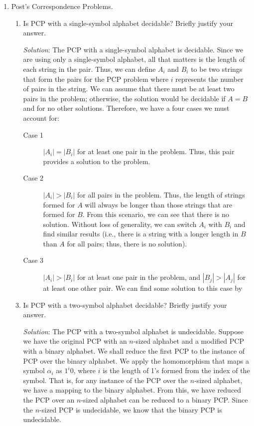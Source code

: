 \documentclass[]{article}
\begin{document}
\begin{enumerate}
\item Post's Correspondence Problems.
\begin{enumerate}
\item Is PCP with a single-symbol alphabet decidable? Briefly justify your
answer.
\item[\emph{Solution}:] The PCP with a single-symbol alphabet is decidable.
Since we are using only a single-symbol alphabet, all that matters is the length
of each string in the pair. Thus, we can define $A_i$ and $B_i$ to be two
strings that form the pairs for the PCP problem where $i$ represents the number
of pairs in the string. We can assume that there must be at least two pairs in
the problem; otherwise, the solution would be decidable if $A = B$ and for no
other solutions. Therefore, we have a four cases we must account for:
\begin{description}
\item[Case 1] $|A_i| = |B_i|$ for at least one pair in the problem. Thus, this
pair provides a solution to the problem.
\item[Case 2] $|A_i| > |B_i|$ for all pairs in the problem. Thus, the length of
strings formed for $A$ will always be longer than those strings that are formed
for $B$. From this scenario, we can see that there is no solution. Without loss
of generality, we can switch $A_i$ with $B_i$ and find similar results (i.e.,
there is a string with a longer length in $B$ than $A$ for all pairs; thus,
there is no solution).
\item[Case 3] $|A_i| > |B_i|$ for at least one pair in the problem, and $|B_j| >
|A_j|$ for at least one other pair. We can find some solution to this case by
\end{description}

\item Is PCP with a two-symbol alphabet decidable? Briefly justify your answer.
\item[\emph{Solution}:] The PCP with a two-symbol alphabet is undecidable.
Suppose we have the original PCP with an $n$-sized alphabet and a modified PCP
with a binary alphabet. We shall reduce the first PCP to the instance of PCP
over the binary alphabet. We apply the homomorphism that maps a symbol
$\alpha_i$ as $1^i0$, where $i$ is the length of 1's formed from the index of
the symbol. That is, for any instance of the PCP over the $n$-sized alphabet, we
have a mapping to the binary alphabet. From this, we have reduced the PCP over
an $n$-sized alphabet can be reduced to a binary PCP. Since the $n$-sized PCP is
undecidable, we know that the binary PCP is undecidable.
\end{enumerate}


\end{enumerate}
\end{document}
